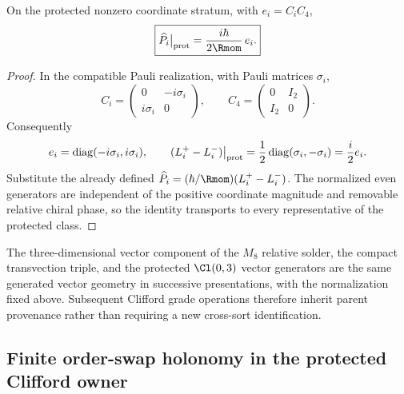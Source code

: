 \documentclass[12pt,a4paper]{article}
\begin{document}
\begin{theorem}
\label{p2c:thm:v187-transvection-clifford-identity}
On the protected nonzero coordinate stratum, with $e_i=C_iC_4$,
\[
 \boxed{\widehat P_i\big|_{\rm prot}
              =\frac{i\hbar}{2\Rmom}\,e_i.}
\]
\end{theorem}
\begin{proof}
In the compatible Pauli realization, with Pauli matrices $\sigma_i$,
\[
 C_i=\begin{pmatrix}0&-i\sigma_i\\i\sigma_i&0\end{pmatrix},
 \qquad C_4=\begin{pmatrix}0&I_2\\I_2&0\end{pmatrix}.
\]
Consequently
\[
 e_i=\operatorname{diag}(-i\sigma_i,i\sigma_i),
 \qquad
 (L_i^+-L_i^-)\big|_{\rm prot}
       =\frac12\operatorname{diag}(\sigma_i,-\sigma_i)
       =\frac i2 e_i.
\]
Substitute the already defined
$\widehat P_i=(\hbar/\Rmom)(L_i^+-L_i^-)$.
The normalized even generators are independent of the positive coordinate
magnitude and removable relative chiral phase, so the identity transports
to every representative of the protected class.
\end{proof}

\begin{corollary}
\label{p2c:cor:v187-common-vector-parent}
The three-dimensional vector component of the $M_8$ relative solder, the
compact transvection triple, and the protected $\Cl(0,3)$ vector generators
are the same generated vector geometry in successive presentations, with the
normalization fixed above.  Subsequent Clifford grade operations therefore
inherit parent provenance rather than requiring a new cross-sort
identification.
\end{corollary}


\subsection{Finite order-swap holonomy in the protected Clifford owner}
\label{p2c:sec:v188-clifford-order-swap}
\end{document}
